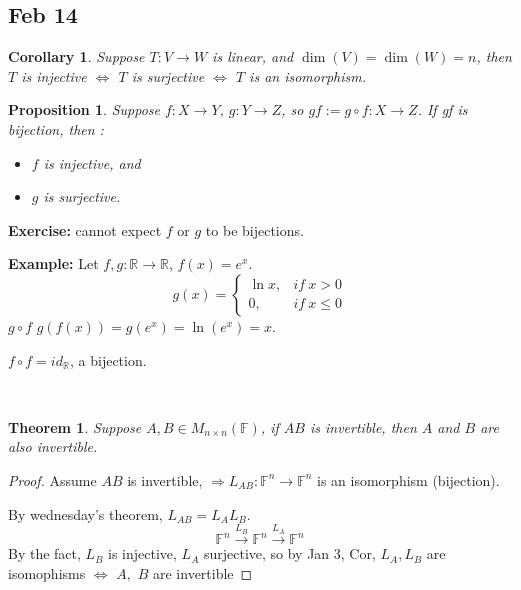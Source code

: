 \documentclass[12pt]{article}
\newtheorem{theorem}{Theorem}[subsection]
\newtheorem{proposition}{Proposition}[subsection]
\newtheorem{corollary}{Corollary}[subsection]
\newcommand{\mR}{{\mathbb{R}}}
\newcommand{\mF}{{\mathbb{F}}}
\begin{document}
	\newpage
	\subsection{Feb 14} 
	\begin{corollary}
		Suppose $T : V \to W$ is linear, and $\dim(V) = \dim(W) = n$, then
		$T$ is injective $\Leftrightarrow$ $T$ is surjective $\Leftrightarrow$
		$T$ is an isomorphism.\\
	\end{corollary}
	
	\begin{proposition}
		Suppose $f : X \to Y$, $g : Y \to Z$, so $gf := g \circ f : X \to Z$.
		If gf is bijection, then : 
		\begin{itemize}
			\item $f$ is injective, and 
			\item $g$ is surjective. \\
		\end{itemize}	
	\end{proposition}

	\textbf{Exercise: }cannot expect $f$ or $g$ to be bijections. \\

	{\color{Brown}
	\textbf{Example: }Let $f,g : \mR \to \mR$, $f(x) = e^x$. 
	\[
		g(x) = 
		\begin{cases}
			\ln x, &if \ x > 0\\
			0,	& if \ x \leq 0
		\end{cases}
	\]
	$g\circ f$ $g(f(x)) = g(e^x) = \ln(e^x) = x$. 

	$f\circ f = id_{\mR}$, a bijection. }\\
	
	\begin{theorem}
		Suppose $A, B \in M_{n \times n} (\mF)$, if $AB$ is invertible, then
		$A$ and $B$ are also invertible. 
	\end{theorem}
	\begin{proof}
		Assume $AB$ is invertible, 
		$\Rightarrow L_{AB}: \mF^n \to \mF^n$ is an isomorphism (bijection). 

		By wednesday's theorem, $L_{AB} = L_A L_B$. 
		\[
			\mF^n \overset{L_B}{\to} \mF^n \overset{L_A}{\to}\mF^n
		\]
		By the fact, $L_B$ is injective, $L_A$ surjective, so by Jan 3, Cor, 
		$L_A, L_B $ are isomophisms $\Leftrightarrow$ $A,$ $B$ are invertible 
	\end{proof}
\end{document}
